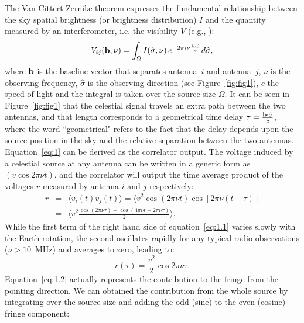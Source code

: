 The Van Cittert-Zernike theorem expresses the fundamental relationship between the sky spatial brightness (or brightness distribution) $I$ and the quantity measured by an interferometer, i.e. the visibility $V$ (e.g., \cite{TMS}):
\begin{equation}
V_{ij} ({\bf b}, \nu) = \int_\Omega {\bar I} (\hat{\bf \sigma}, \nu) \, e^{-2 \pi i \nu \frac{{\bf b} \cdot {\hat {\bf \sigma}}}{c}} d \hat{\bf \sigma},
\label{eq:1}
\end{equation}
where ${\bf b}$ is the baseline vector that separates antenna~$i$ and antenna~$j$, $\nu$ is the observing frequency, $\hat{\sigma}$ is the observing direction (see Figure~\ref{fig:fig1}), $c$ the speed of light and the integral is taken over the source size $\Omega$. 
It can be seen in Figure~\ref{fig:fig1} that the celestial signal travels an extra path between the two antennas, and that length corresponds to a geometrical time delay $\tau = \frac{{\bf b} \cdot {\hat {\bf \sigma}}}{c}$, where the word ``geometrical" refers to the fact that the delay depends upon the source position in the sky and the relative separation between the two antennas. Equation~\ref{eq:1} can be derived as the correlator output. The voltage induced by a celestial source at any antenna can be written in a generic form as $(v \cos{2\pi \nu t})$, and the correlator will output the time average product of the voltages $r$ measured by antenna $i$ and $j$ respectively:
\begin{eqnarray}
r & = & \langle v_i(t)v_j(t) \rangle = \langle v^2 \cos{(2\pi \nu t)} \cos{[2\pi \nu (t - \tau)]} \nonumber \\
			     & = & \langle v^2 \frac{\cos{(2\pi \nu \tau)} + \cos{(4\pi \nu t - 2\pi \nu \tau)}}{2} \rangle. 	
\label{eq:1.1}
\end{eqnarray}
While the first term of the right hand side of equation~\ref{eq:1.1} varies slowly with the Earth rotation, the second oscillates rapidly for any typical radio observations ($\nu > 10$~MHz) and averages to zero, leading to:  
\begin{equation}
r(\tau) = \frac{v^2}{2} \cos{2\pi \nu \tau}.
\label{eq:1.2}
\end{equation}
Equation~\ref{eq:1.2} actually represents the contribution to the fringe from the pointing direction. We can obtained the contribution from the whole source by integrating over the source size and adding the odd (sine) to the even (cosine) fringe component: 
